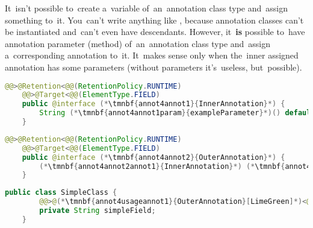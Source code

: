 It~isn't possible to~create a~variable of~an~annotation class type and~assign something to~it.
You~can't write anything like , because annotation classes can't be instantiated and~can't even have descendants.
However, it~\textbf{is} possible to~have annotation parameter (method) of~an~annotation class type and~assign a~corresponding annotation to~it.
It~makes sense only when the~inner assigned annotation has some parameters (without parameters it's~useless, but~possible).

\example
\begin{lstlisting}[language=Java, title={Inner annotation}]
    @@>@Retention<@@(RetentionPolicy.RUNTIME)
    @@>@Target<@@(ElementType.FIELD)
    public @interface (*\tmnbf{annot4annot1}{InnerAnnotation}*) {
        String (*\tmnbf{annot4annot1param}{exampleParameter}*)() default "example default value";
    }
\end{lstlisting}
\begin{lstlisting}[language=Java, title={Outer annotation}]
    @@>@Retention<@@(RetentionPolicy.RUNTIME)
    @@>@Target<@@(ElementType.FIELD)
    public @interface (*\tmnbf{annot4annot2}{OuterAnnotation}*) {
        (*\tmnbf{annot4annot2annot1}{InnerAnnotation}*) (*\tmnbf{annot4annot2param1}{innerAnnotation}*)() default @@>@(*\tmnbf{annot4annot2annot2}{InnerAnnotation}[LimeGreen]*)<@@((*\tmnbf{annot4annot2param2}{exampleParameter}*) = "overridden default value");
    }
\end{lstlisting}
\begin{lstlisting}[language=Java, title={Usage}]
    public class SimpleClass {
        @@>@(*\tmnbf{annot4usageannot1}{OuterAnnotation}[LimeGreen]*)<@@((*\tmnbf{annot4usageparam1}{innerAnnotation}*) = @@>@(*\tmnbf{annot4usageannot2}{InnerAnnotation}[LimeGreen]*)<@@((*\tmnbf{annot4usageparam2}{exampleParameter}*) = "new value"))
        private String simpleField;
    }
\end{lstlisting}
\newpage

